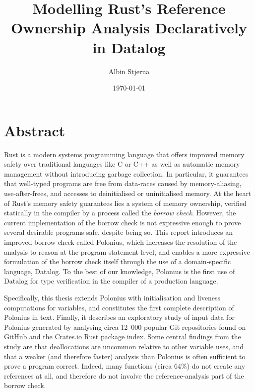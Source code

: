 \documentclass[11pt,a4paper,twoside,openany]{report}
\author{Albin Stjerna}
\date{\today}
\title{Modelling Rust's Reference Ownership Analysis Declaratively in Datalog}
\begin{document}


\maketitle

\section*{Abstract}

Rust is a modern systems programming language that offers improved memory safety
over traditional languages like C or C++ as well as automatic memory management
without introducing garbage collection. In particular, it guarantees that
well-typed programs are free from data-races caused by memory-aliasing,
use-after-frees, and accesses to deinitialised or uninitialised memory. At the
heart of Rust's memory safety guarantees lies a system of memory ownership,
verified statically in the compiler by a process called the \textit{borrow
  check}. However, the current implementation of the borrow check is not
expressive enough to prove several desirable programs safe, despite being so.
This report introduces an improved borrow check called Polonius, which increases
the resolution of the analysis to reason at the program statement level, and
enables a more expressive formulation of the borrow check itself through the use
of a domain-specific language, Datalog. To the best of our knowledge, Polonius
is the first use of Datalog for type verification in the compiler of a
production language.

Specifically, this thesis extends Polonius with initialisation and liveness
computations for variables, and constitutes the first complete description of
Polonius in text. Finally, it describes an exploratory study of input
data for Polonius generated by analysing circa 12~000 popular Git repositories
found on GitHub and the Crates.io Rust package index. Some central findings from
the study are that deallocations are uncommon relative to other variable uses,
and that a weaker (and therefore faster) analysis than Polonius is often
sufficient to prove a program correct. Indeed, many functions (circa 64\%) do
not create any references at all, and therefore do not involve the
reference-analysis part of the borrow check.
\end{document}
